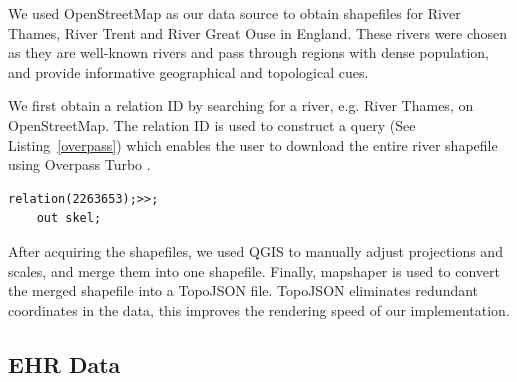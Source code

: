 
We used OpenStreetMap \cite{openstreetmapRelation} as our data source to obtain shapefiles for River Thames, River Trent and River Great Ouse in England. These rivers were chosen as they are well-known rivers and pass through regions with dense population, and provide informative geographical and topological cues. 

We first obtain a relation ID by searching for a river, e.g. River Thames, on OpenStreetMap. The relation ID is used to construct a query (See Listing~\ref{overpass}) which enables the user to download the entire river shapefile using Overpass Turbo \cite{overpassturboOverpass}.

\begin{lstlisting}[caption={The query that downloads the shapefile of River Thames from OpenStreetMap via the Overpass Turbo API.}, label={overpass},captionpos=b]
    relation(2263653);>>;
    out skel;
\end{lstlisting}

After acquiring the shapefiles, we used QGIS \cite{qgisWelcome} to manually adjust projections and scales, and merge them into one shapefile. Finally, mapshaper \cite{blochMapshaper} is used to convert the merged shapefile into a TopoJSON \cite{TopoJSON} file. TopoJSON eliminates redundant coordinates in the data, this improves the rendering speed of our implementation.

\subsection{EHR Data}

